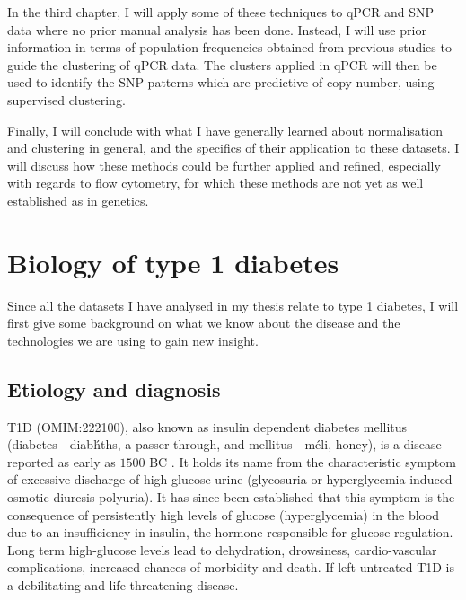 In the third chapter, I will apply some of these techniques to \gls{qPCR} and \gls{SNP} data where no prior manual analysis has been done.
Instead, I will use prior information in terms of population frequencies obtained from previous studies to guide the clustering of qPCR data.
The clusters applied in qPCR will then be used to identify the SNP patterns which are predictive of copy number, using supervised clustering.

Finally, I will conclude with what I have generally learned about normalisation and clustering in general, and the specifics of their application to these datasets.
I will discuss how these methods could be further applied and refined, especially with regards to flow cytometry, for which these methods are
not yet as well established as in genetics.


\section{Biology of type 1 diabetes}

Since all the datasets I have analysed in my thesis relate to type 1 diabetes, I will first give some background on
what we know about the disease and the technologies we are using to gain new insight.

\subsection{Etiology and diagnosis}

\Gls{T1D} (OMIM:222100), also known as insulin dependent diabetes mellitus (diabetes - \foreignlanguage{greek}{diab\'hths},
a passer through, and mellitus - \foreignlanguage{greek}{m\'eli}, honey), is a disease reported as early as $1500$ BC \citep{Poretsky:2010wr}.
It holds its name from the characteristic symptom of excessive discharge of high-glucose urine (glycosuria or hyperglycemia-induced osmotic diuresis polyuria).
It has since been established that this symptom is the consequence of persistently high levels of glucose (hyperglycemia) in the blood due to an insufficiency in insulin,
the hormone responsible for glucose regulation.
Long term high-glucose levels lead to dehydration, drowsiness, cardio-vascular complications, increased chances of morbidity and death.  
If left untreated T1D is a debilitating and life-threatening disease.

